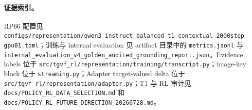 \documentclass[UTF8,twocolumn,10pt,a4paper]{ctexart}
\begin{document}
\paragraph{证据索引。}
RP66 配置见 \nolinkurl{configs/representation/qwen3_instruct_balanced_t1_contextual_2000step_gpu01.toml}；训练与 internal evaluation 见 artifact 目录中的 \nolinkurl{metrics.jsonl} 与 \nolinkurl{internal_evaluation_v4_golden_audited_grounding_report.json}。Evidence labels 位于 \nolinkurl{src/tgvf_rl/representation/training/transcript.py}；image-key block 位于 \nolinkurl{streaming.py}；Adapter target-valued delta 位于 \nolinkurl{src/tgvf_rl/representation/adapter.py}；T1 与 RL 审计见 \nolinkurl{docs/POLICY_RL_DATA_SELECTION.md} 和 \nolinkurl{docs/POLICY_RL_FUTURE_DIRECTION_20260728.md}。
\end{document}
